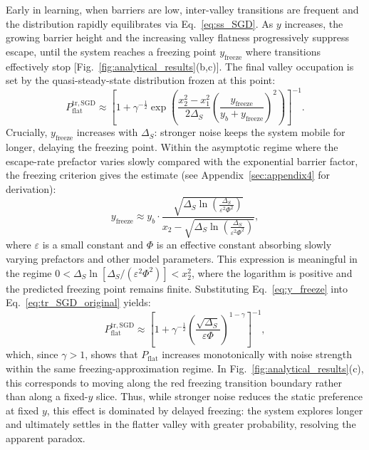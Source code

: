 \documentclass[aps,prx,reprint,superscriptaddress,longbibliography,nofootinbib,floatfix]{revtex4-2}
\begin{document}
Early in learning, when barriers are low, inter-valley transitions are frequent and the distribution rapidly equilibrates via Eq.~\ref{eq:ss_SGD}. As $y$ increases, the growing barrier height and the increasing valley flatness progressively suppress escape, until the system reaches a freezing point $y_{\mathrm{freeze}}$ where transitions effectively stop [Fig.~\ref{fig:analytical_results}(b,c)]. The final valley occupation is set by the quasi-steady-state distribution frozen at this point:
\begin{equation}
P_{\mathrm{flat}}^{\mathrm{tr,SGD}} \approx
\left[1+\gamma^{-\frac{1}{2}}
\exp\!\left(\frac{x_2^2-x_1^2}{2 \Delta_S}
\left(\frac{y_\mathrm{freeze}}{y_b+y_\mathrm{freeze}}\right)^2\right)\right]^{-1}.
\label{eq:tr_SGD_original}
\end{equation}
Crucially, $y_\mathrm{freeze}$ increases with $\Delta_S$: stronger noise keeps the system mobile for longer, delaying the freezing point. Within the asymptotic regime where the escape-rate prefactor varies slowly compared with the exponential barrier factor, the freezing criterion gives the estimate (see Appendix~\ref{sec:appendix4} for derivation):
\begin{equation}
y_\mathrm{freeze} \approx y_b \cdot \frac{\sqrt{\Delta_S \ln\left( \frac{\Delta_S}{\varepsilon^2 \Phi^2} \right)}}{x_2 - \sqrt{\Delta_S \ln\left( \frac{\Delta_S}{\varepsilon^2 \Phi^2} \right)}},
\label{eq:y_freeze}
\end{equation}
where $\varepsilon$ is a small constant and $\Phi$ is an effective constant absorbing slowly varying prefactors and other model parameters. This expression is meaningful in the regime $0<\Delta_S \ln[\Delta_S/(\varepsilon^2\Phi^2)]<x_2^2$, where the logarithm is positive and the predicted freezing point remains finite. Substituting Eq.~\ref{eq:y_freeze} into Eq.~\ref{eq:tr_SGD_original} yields:
\begin{equation}
P_{\mathrm{flat}}^{\mathrm{tr,SGD}} \approx \left[ 1 + \gamma^{-\frac{1}{2}} \left( \frac{\sqrt{\Delta_S}}{\varepsilon \Phi} \right)^{1-\gamma} \right]^{-1},
\label{eq:tr_SGD}
\end{equation}
which, since $\gamma > 1$, shows that $P_{\mathrm{flat}}$ increases monotonically with noise strength within the same freezing-approximation regime. In Fig.~\ref{fig:analytical_results}(c), this corresponds to moving along the red freezing transition boundary rather than along a fixed-$y$ slice. Thus, while stronger noise reduces the static preference at fixed $y$, this effect is dominated by delayed freezing: the system explores longer and ultimately settles in the flatter valley with greater probability, resolving the apparent paradox.
\end{document}
